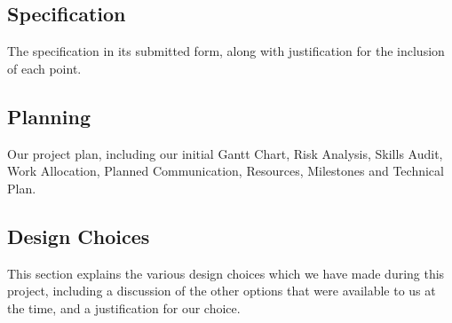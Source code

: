 \subsection{Specification}
The specification in its submitted form, along with justification for the inclusion of each point.

\subsection{Planning}
Our project plan, including our initial Gantt Chart, Risk Analysis, Skills Audit, Work Allocation, Planned Communication, Resources, Milestones and Technical Plan.

\subsection{Design Choices}
This section explains the various design choices which we have made during this project, including a discussion of the other options that were available to us at the time, and a justification for our choice.



